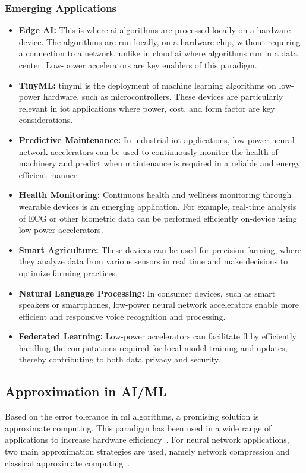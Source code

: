 \subsubsection{Emerging Applications}
\begin{itemize}
	\item \textbf{Edge AI:} This is where \gls{ai} algorithms are processed locally on a hardware device. The algorithms are run locally, on a hardware chip, without requiring a connection to a network, unlike in cloud \gls{ai} where algorithms run in a data center. Low-power accelerators are key enablers of this paradigm.
	\item \textbf{TinyML:} \gls{tinyml} is the deployment of machine learning algorithms on low-power hardware, such as microcontrollers. These devices are particularly relevant in \gls{iot} applications where power, cost, and form factor are key considerations.
	\item \textbf{Predictive Maintenance:} In industrial \gls{iot} applications, low-power neural network accelerators can be used to continuously monitor the health of machinery and predict when maintenance is required in a reliable and energy efficient manner.
	\item \textbf{Health Monitoring:} Continuous health and wellness monitoring through wearable devices is an emerging application. For example, real-time analysis of ECG or other biometric data can be performed efficiently on-device using low-power accelerators.
	\item \textbf{Smart Agriculture:} These devices can be used for precision farming, where they analyze data from various sensors in real time and make decisions to optimize farming practices.
	\item \textbf{Natural Language Processing:} In consumer devices, such as smart speakers or smartphones, low-power neural network accelerators enable more efficient and responsive voice recognition and processing.
	\item \textbf{Federated Learning:} Low-power accelerators can facilitate \gls{fl} by efficiently handling the computations required for local model training and updates, thereby contributing to both data privacy and security.
\end{itemize}



\subsection{Approximation in AI/ML}
Based on the error tolerance in \gls{ml} algorithms, a promising solution is approximate computing. This paradigm has been used in a wide range of applications to increase hardware efficiency~\cite{han2013approximate}. For neural network applications, two main approximation strategies are used, namely network compression and classical approximate computing~\cite{bouvier2019spiking}.

